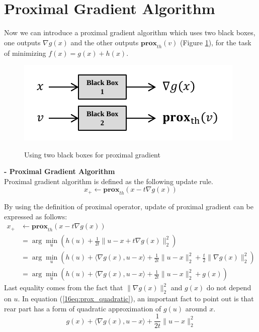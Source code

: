 \documentclass[12pt]{report}
\begin{document}
\section{Proximal Gradient Algorithm} \label{PGA_ALGORITHM}
Now we can introduce a proximal gradient algorithm which uses two black boxes, one outputs $\nabla g(x)$ and the other outputs $\textbf{prox}_{th}(v)$ (Figure \ref{16fig:twoblackboxes}), for the task of minimizing $f(x) = g(x) + h(x)$.
\begin{figure}[ht]
    \centering
    \includegraphics[scale=1]{L16_fig_twoblackboxes}\\
    \caption{Using two black boxes for proximal gradient}\label{16fig:twoblackboxes}
\end{figure}

\vspace{1em}
\noindent\textbf{- Proximal Gradient Algorithm}\\
Proximal gradient algorithm is defined as the following update rule.
\begin{equation}
x_+ \leftarrow \textbf{prox}_{th} \left(x - t\nabla g(x) \right)
\end{equation}

By using the definition of proximal operator, update of proximal gradient can be expressed as follows:
\begin{align}
x_+ &\leftarrow \textbf{prox}_{th} \left(x - t\nabla g(x) \right)\nonumber\\
&= \arg\min_u \left( h(u)+\frac{1}{2t}\|u-x+t\nabla g(x)\|_2^2 \right)\nonumber\\
&= \arg\min_u \left( h(u)+\langle \nabla g(x), u-x \rangle + \frac{1}{2t}\|u-x\|_2^2 +\frac{t}{2}\| \nabla g(x) \|_2^2 \right)\nonumber\\
&= \arg\min_u \left( h(u)+\langle \nabla g(x), u-x \rangle + \frac{1}{2t}\|u-x\|_2^2 + g(x) \right)
\end{align}\label{16eq:prox_quadratic}
Last equality comes from the fact that $\| \nabla g(x) \|_2^2$ and $g(x)$ do not depend on $u$. In equation (\ref{16eq:prox_quadratic}), an important fact to point out is that rear part has a form of quadratic approximation of $g(u)$ around $x$.
\begin{equation}
g(x) + \langle \nabla g(x), u-x \rangle + \frac{1}{2t}\|u-x\|_2^2 
\end{equation} 
\end{document}
